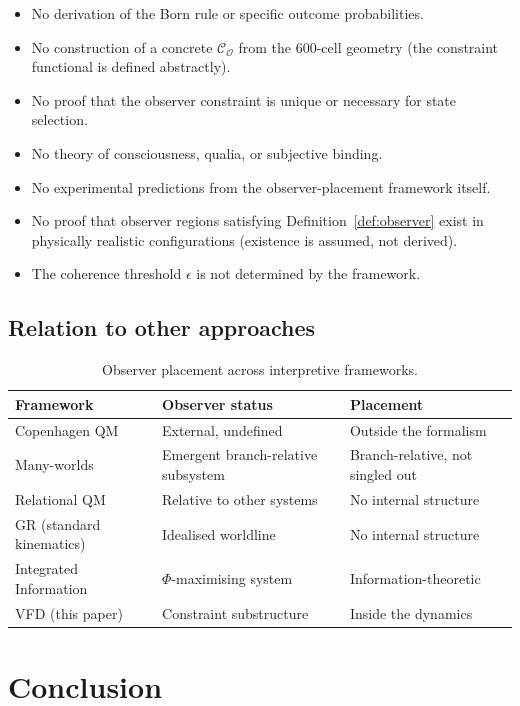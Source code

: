 \documentclass[12pt]{article}
\newcommand{\Ocal}{\mathcal{O}}
\newcommand{\Ccal}{\mathcal{C}}
\begin{document}
\begin{itemize}
    \item No derivation of the Born rule or specific outcome probabilities.
    \item No construction of a concrete $\Ccal_\Ocal$ from the 600-cell geometry (the constraint functional is defined abstractly).
    \item No proof that the observer constraint is unique or necessary for state selection.
    \item No theory of consciousness, qualia, or subjective binding.
    \item No experimental predictions from the observer-placement framework itself.
    \item No proof that observer regions satisfying Definition~\ref{def:observer} exist in physically realistic configurations (existence is assumed, not derived).
    \item The coherence threshold $\epsilon$ is not determined by the framework.
\end{itemize}

\subsection{Relation to other approaches}

\begin{table}[ht]
\centering
\caption{Observer placement across interpretive frameworks.}
\label{tab:comparison}
\begin{tabular}{@{}lll@{}}
\toprule
Framework & Observer status & Placement \\
\midrule
Copenhagen QM & External, undefined & Outside the formalism \\
Many-worlds & Emergent branch-relative subsystem & Branch-relative, not singled out \\
Relational QM & Relative to other systems & No internal structure \\
GR (standard kinematics) & Idealised worldline & No internal structure \\
Integrated Information & $\Phi$-maximising system & Information-theoretic \\
VFD (this paper) & Constraint substructure & Inside the dynamics \\
\bottomrule
\end{tabular}
\end{table}

\section{Conclusion}\label{sec:conclusion}
\end{document}
